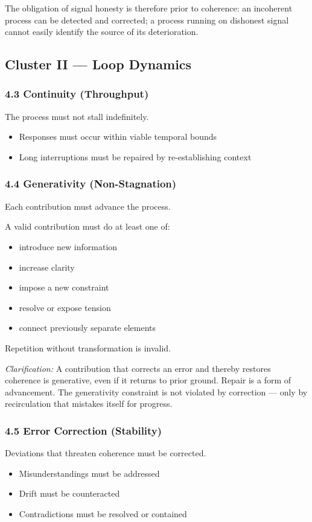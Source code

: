 \documentclass{article}
\begin{document}
The obligation of signal honesty is therefore prior to coherence: an incoherent process can be detected and corrected; a process running on dishonest signal cannot easily identify the source of its deterioration.

\subsection*{Cluster II — Loop Dynamics}
\subsubsection*{4.3 Continuity (Throughput)}
The process must not stall indefinitely.
\begin{itemize}
    \item Responses must occur within viable temporal bounds
    \item Long interruptions must be repaired by re-establishing context
\end{itemize}

\subsubsection*{4.4 Generativity (Non-Stagnation)}
Each contribution must advance the process.

A valid contribution must do at least one of:
\begin{itemize}
    \item introduce new information
    \item increase clarity
    \item impose a new constraint
    \item resolve or expose tension
    \item connect previously separate elements
\end{itemize}

Repetition without transformation is invalid.

\epigraph{\textit{Clarification:} A contribution that corrects an error and thereby restores coherence is generative, even if it returns to prior ground. Repair is a form of advancement. The generativity constraint is not violated by correction — only by recirculation that mistakes itself for progress.}{}

\subsubsection*{4.5 Error Correction (Stability)}
Deviations that threaten coherence must be corrected.
\begin{itemize}
    \item Misunderstandings must be addressed
    \item Drift must be counteracted
    \item Contradictions must be resolved or contained
\end{itemize}
\end{document}
